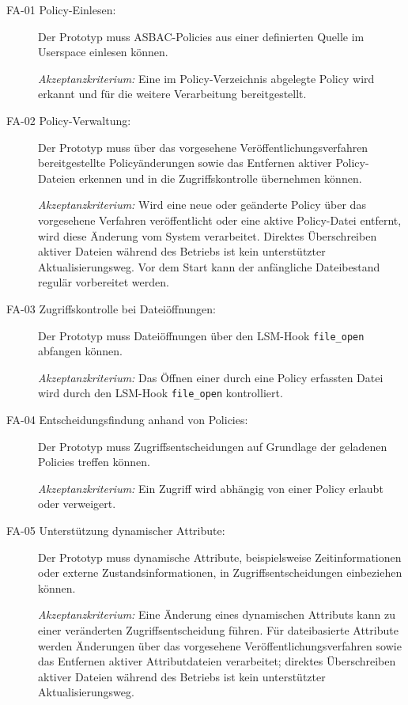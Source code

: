 \begin{description}
    \item[FA-01 Policy-Einlesen:]
    Der Prototyp muss ASBAC-Policies aus einer definierten Quelle im Userspace einlesen können.
    
    \textit{Akzeptanzkriterium:} Eine im Policy-Verzeichnis abgelegte Policy wird erkannt und für die weitere Verarbeitung bereitgestellt.

    \item[FA-02 Policy-Verwaltung:]
    Der Prototyp muss über das vorgesehene Veröffentlichungsverfahren bereitgestellte Policyänderungen sowie das Entfernen aktiver Policy-Dateien erkennen und in die Zugriffskontrolle übernehmen können.
    
    \textit{Akzeptanzkriterium:} Wird eine neue oder geänderte Policy über das vorgesehene Verfahren veröffentlicht oder eine aktive Policy-Datei entfernt, wird diese Änderung vom System verarbeitet. Direktes Überschreiben aktiver Dateien während des Betriebs ist kein unterstützter Aktualisierungsweg. Vor dem Start kann der anfängliche Dateibestand regulär vorbereitet werden.

    \item[FA-03 Zugriffskontrolle bei Dateiöffnungen:]
    Der Prototyp muss Dateiöffnungen über den LSM-Hook \texttt{file\_open} abfangen können.
    
    \textit{Akzeptanzkriterium:} Das Öffnen einer durch eine Policy erfassten Datei wird durch den LSM-Hook \texttt{file\_open} kontrolliert.

    \item[FA-04 Entscheidungsfindung anhand von Policies:]
    Der Prototyp muss Zugriffsentscheidungen auf Grundlage der geladenen Policies treffen können.
    
    \textit{Akzeptanzkriterium:} Ein Zugriff wird abhängig von einer Policy erlaubt oder verweigert.

    \item[FA-05 Unterstützung dynamischer Attribute:]
    Der Prototyp muss dynamische Attribute, beispielsweise Zeitinformationen oder externe Zustandsinformationen, in Zugriffsentscheidungen einbeziehen können.
    
    \textit{Akzeptanzkriterium:} Eine Änderung eines dynamischen Attributs kann zu einer veränderten Zugriffsentscheidung führen. Für dateibasierte Attribute werden Änderungen über das vorgesehene Veröffentlichungsverfahren sowie das Entfernen aktiver Attributdateien verarbeitet; direktes Überschreiben aktiver Dateien während des Betriebs ist kein unterstützter Aktualisierungsweg.


\end{description}
